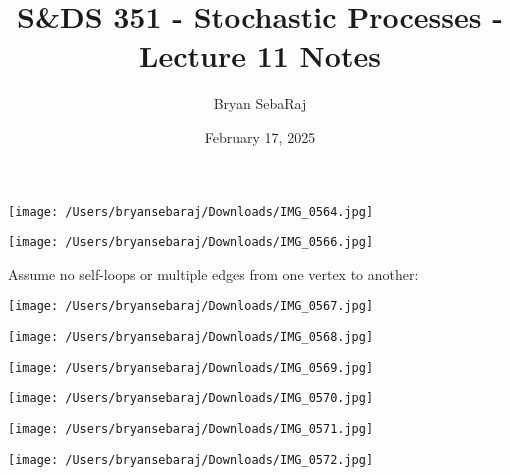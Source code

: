 \documentclass{article}
\title{S\&DS 351 - Stochastic Processes - Lecture 11 Notes}
\author{Bryan SebaRaj}
\date{February 17, 2025}
\begin{document}
\maketitle


\texttt{[image: /Users/bryansebaraj/Downloads/IMG\_0564.jpg]}

\texttt{[image: /Users/bryansebaraj/Downloads/IMG\_0566.jpg]}

Assume no self-loops or multiple edges from one vertex to another:

\texttt{[image: /Users/bryansebaraj/Downloads/IMG\_0567.jpg]}

\texttt{[image: /Users/bryansebaraj/Downloads/IMG\_0568.jpg]}

\texttt{[image: /Users/bryansebaraj/Downloads/IMG\_0569.jpg]}

\texttt{[image: /Users/bryansebaraj/Downloads/IMG\_0570.jpg]}

\texttt{[image: /Users/bryansebaraj/Downloads/IMG\_0571.jpg]}

\texttt{[image: /Users/bryansebaraj/Downloads/IMG\_0572.jpg]}


\end{document}

